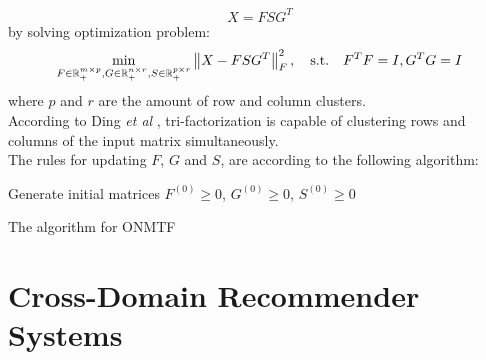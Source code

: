 \begin{equation*}
X = FSG^T
\end{equation*}
by solving optimization problem:
\begin{equation*}
\min_{F \in \mathbb{R}^{m \times p}_+, G \in \mathbb{R}^{n \times r}_+, S \in \mathbb{R}^{p \times r}_+} \left\lVert X - F S G^T\right\rVert_F^2, \quad \text{s.t.} \quad F^TF = I, G^TG = I
\end{equation*}
where $p$ and $r$ are the amount of row and column clusters.\\
According to Ding \textit{et al} \cite{10.1145/1150402.1150420}, tri-factorization is capable of clustering rows and columns of the input matrix simultaneously.\\
The rules for updating $F$, $G$ and $S$, are according to the following algorithm:
\vskip 0.7cm
\begin{algorithm}[H]
Generate initial matrices $F^{(0)} \geq 0$, $G^{(0)} \geq 0$, $S^{(0)} \geq 0$\;
\caption{The algorithm for ONMTF}
\end{algorithm}



\section{Cross-Domain Recommender Systems}

